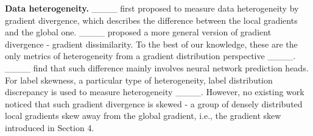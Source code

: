\textbf{Data heterogeneity.}
____ first proposed to measure data heterogeneity by gradient divergence, which describes the difference between the local gradients and the global one. ____ proposed a more general version of gradient divergence - gradient dissimilarity. To the best of our knowledge, these are the only metrics of heterogeneity from a gradient distribution perspective ____. ____ find that such difference mainly involves neural network prediction heads. For label skewness, a particular type of heterogeneity, label distribution discrepancy is used to measure heterogeneity ____. However, no existing work noticed that such gradient divergence is skewed - a group of densely distributed local gradients skew away from the global gradient, i.e., the gradient skew introduced in Section 4.